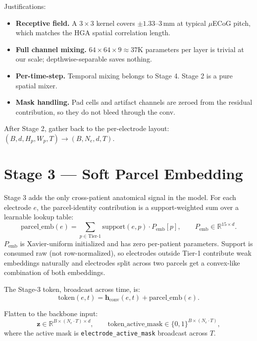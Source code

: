\documentclass[11pt,letterpaper]{article}
\newcommand{\R}{\mathbb{R}}
\newcommand{\bz}{\mathbf{z}}
\newcommand{\bh}{\mathbf{h}}
\begin{document}
Justifications:
\begin{itemize}[leftmargin=2em, itemsep=0.2em]
\item \textbf{Receptive field.} A $3\times3$ kernel covers $\pm 1.33$--$3$\,mm at typical $\mu$ECoG pitch, which matches the HGA spatial correlation length.
\item \textbf{Full channel mixing.} $64 \times 64 \times 9 \approx 37$K parameters per layer is trivial at our scale; depthwise-separable saves nothing.
\item \textbf{Per-time-step.} Temporal mixing belongs to Stage 4. Stage 2 is a pure spatial mixer.
\item \textbf{Mask handling.} Pad cells and artifact channels are zeroed from the residual contribution, so they do not bleed through the conv.
\end{itemize}

After Stage 2, gather back to the per-electrode layout: $(B, d, H_p, W_p, T) \rightarrow (B, N_e, d, T)$.


\section{Stage 3 --- Soft Parcel Embedding}

Stage 3 adds the only cross-patient anatomical signal in the model. For each electrode $e$, the parcel-identity contribution is a support-weighted sum over a learnable lookup table:
\begin{equation}
\text{parcel\_emb}(e) = \sum_{p \in \text{Tier-1}} \text{support}(e, p) \cdot P_{\text{emb}}[p],
\qquad
P_{\text{emb}} \in \R^{15 \times d}.
\end{equation}
$P_{\text{emb}}$ is Xavier-uniform initialized and has zero per-patient parameters. Support is consumed raw (not row-normalized), so electrodes outside Tier-1 contribute weak embeddings naturally and electrodes split across two parcels get a convex-like combination of both embeddings.

The Stage-3 token, broadcast across time, is:
\begin{equation}
\text{token}(e, t) = \bh_{\text{conv}}(e, t) + \text{parcel\_emb}(e).
\end{equation}

Flatten to the backbone input:
\begin{equation}
\bz \in \R^{B \times (N_e \cdot T) \times d},
\qquad
\text{token\_active\_mask} \in \{0,1\}^{B \times (N_e \cdot T)},
\end{equation}
where the active mask is \texttt{electrode\_active\_mask} broadcast across $T$.
\end{document}
